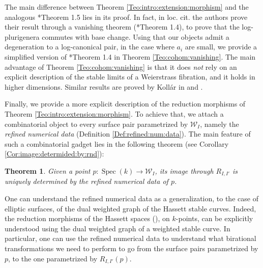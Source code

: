 \documentclass[11pt]{amsart}
\newcommand{\cE}{\mathcal{W}}
\newcommand{\spec}{\operatorname{Spec}}
\newtheorem{Teo}[theorem]{Theorem}
\theoremstyle{definition}
\begin{document}
The main difference between Theorem \ref{Teo:intro:extension:morphism} and the analogous \cite{AB3}*{Theorem 1.5} lies in its proof. In fact, in loc. cit. the authors prove their result through a vanishing theorem (\cite{AB3}*{Theorem 1.4}), to prove that the log-plurigenera commutes with base change. Using that our objects admit a degeneration to a log-canonical pair, in the case where $a_i$ are small, we provide a simplified version of \cite{AB3}*{Theorem 1.4} in Theorem \ref{Teo:cohom:vanishing}. The main advantage of Theorem \ref{Teo:cohom:vanishing} is that it does \emph{not} rely on an explicit description of the stable limits of a Weierstrass fibration, and it holds in higher dimensions. Similar results are proved by Koll\'ar in \cite{kollar2018log} and \cite{kollar2018logs}.

Finally, we provide a more explicit description of the reduction morphisms of Theorem \ref{Teo:intro:extension:morphism}.
To achieve that, we attach a combinatorial object to every surface pair parametrized by $\cE_I$, namely the \emph{refined numerical data} (Definition \ref{Def:refined:num:data}).
The main feature of such a combinatorial gadget lies in the following theorem (see Corollary \ref{Cor:image:determided:by:rnd}):
\begin{Teo}
Given a point $p: \spec(k) \to\cE_I$, its image through $R_{I,I'}$ is uniquely determined by the refined numerical data of $p$. 
\end{Teo}

One can understand the refined numerical data as a generalization, to the case of elliptic surfaces, of the dual weighted graph of the Hassett stable curves. Indeed, the reduction morphisms of the Hassett spaces (\cite{Hassett}), on $k$-points, can be explicitly understood using the dual weighted graph of a weighted stable curve.
In particular, one can use the refined numerical data to understand what birational transformations we need to perform to go from the surface pairs parametrized by $p$, to the one parametrized by $R_{I,I'}(p)$.
\end{document}

